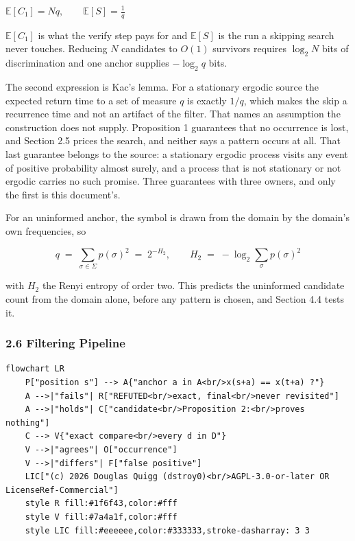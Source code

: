\(\mathbb{E}[C_1] = N q, \qquad \mathbb{E}[S] = \frac{1}{q}\)

\(\mathbb{E}[C_1]\) is what the verify step pays for and \(\mathbb{E}[S]\) is the run a skipping search never touches. Reducing \(N\) candidates to \(O(1)\) survivors requires \(\log_2 N\) bits of discrimination and one anchor supplies \(-\log_2 q\) bits.

The second expression is Kac's lemma. For a stationary ergodic source the expected return time to a set of measure \(q\) is exactly \(1/q\), which makes the skip a recurrence time and not an artifact of the filter. That names an assumption the construction does not supply. Proposition 1 guarantees that no occurrence is lost, and Section 2.5 prices the search, and neither says a pattern occurs at all. That last guarantee belongs to the source: a stationary ergodic process visits any event of positive probability almost surely, and a process that is not stationary or not ergodic carries no such promise. Three guarantees with three owners, and only the first is this document's.

For an uninformed anchor, the symbol is drawn from the domain by the domain's own frequencies, so

\[
q \;=\; \sum_{\sigma \in \Sigma} p(\sigma)^2 \;=\; 2^{-H_2}, \qquad
H_2 \;=\; -\log_2 \sum_{\sigma} p(\sigma)^2
\]

with \(H_2\) the Renyi entropy of order two. This predicts the uninformed candidate count from the domain alone, before any pattern is chosen, and Section 4.4 tests it.

\subsubsection{2.6 Filtering Pipeline}

\begin{lstlisting}[breaklines=true,breakatwhitespace=false,basicstyle=\ttfamily\small]
flowchart LR
    P["position s"] --> A{"anchor a in A<br/>x(s+a) == x(t+a) ?"}
    A -->|"fails"| R["REFUTED<br/>exact, final<br/>never revisited"]
    A -->|"holds"| C["candidate<br/>Proposition 2:<br/>proves nothing"]
    C --> V{"exact compare<br/>every d in D"}
    V -->|"agrees"| O["occurrence"]
    V -->|"differs"| F["false positive"]
    LIC["(c) 2026 Douglas Quigg (dstroy0)<br/>AGPL-3.0-or-later OR LicenseRef-Commercial"]
    style R fill:#1f6f43,color:#fff
    style V fill:#7a4a1f,color:#fff
    style LIC fill:#eeeeee,color:#333333,stroke-dasharray: 3 3
\end{lstlisting}

